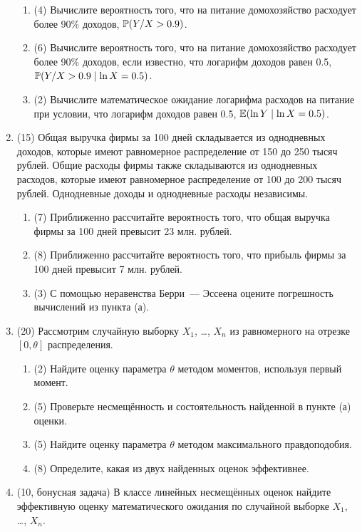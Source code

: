 \begin{enumerate}
\begin{enumerate}
\item  (4) Вычислите вероятность того, что на питание домохозяйство расходует более 90\% доходов,
$\P(Y / X >0.9)$.
\item  (6) Вычислите вероятность того, что на питание домохозяйство расходует более 90\% доходов, если известно, что логарифм доходов равен 0.5,
$\P( Y / X >0.9 \mid \ln X  = 0.5)$.
\item  (2) Вычислите математическое ожидание логарифма расходов на питание при условии, что логарифм доходов равен 0.5,
$\E(\ln Y \mid \ln X=0.5)$.
\end{enumerate}



\item (15) Общая выручка фирмы за 100 дней складывается из однодневных доходов, 
которые имеют равномерное распределение от 150 до 250 тысяч рублей. 
Общие расходы фирмы также складываются из однодневных расходов, 
которые имеют равномерное распределение от 100 до 200 тысяч рублей. 
Однодневные доходы и однодневные расходы независимы.
\begin{enumerate}
  \item (7) Приближенно рассчитайте вероятность того, что общая выручка фирмы за 100 дней превысит 23 млн. рублей.
\item (8) Приближенно рассчитайте вероятность того, что прибыль фирмы за 100 дней превысит 7 млн. рублей.
\item (3) С помощью неравенства Берри~— Эссеена оцените погрешность вычислений из пункта (а).
\end{enumerate}

\item (20) Рассмотрим случайную выборку $X_1$, \ldots, $X_n$ из равномерного на отрезке $[0, \theta]$ распределения.
\begin{enumerate}
\item (2) Найдите оценку параметра $\theta$ методом моментов, используя первый момент.
\item (5) Проверьте несмещённость и состоятельность найденной в пункте (а) оценки. 
\item (5) Найдите оценку параметра $\theta$ методом максимального правдоподобия.
\item (8) Определите, какая из двух найденных оценок эффективнее.
\end{enumerate}

\item (10, бонусная задача) В классе линейных несмещённых оценок 
найдите эффективную оценку математического ожидания по случайной выборке $X_1$, \ldots, $X_n$.

\end{enumerate}

